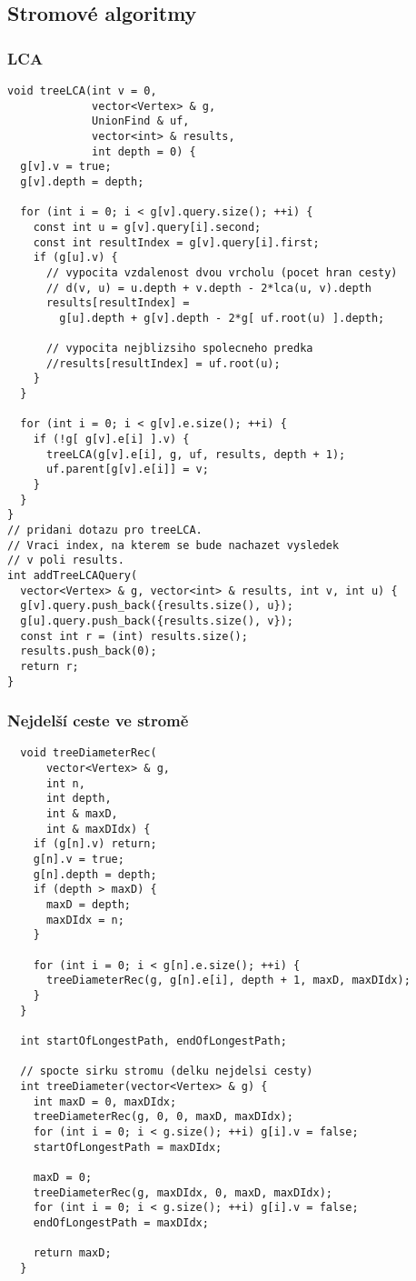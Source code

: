 \documentclass{article}
\begin{document}
\subsection{Stromové algoritmy}
\subsubsection{LCA}
\begin{lstlisting}
void treeLCA(int v = 0, 
             vector<Vertex> & g,
             UnionFind & uf,
             vector<int> & results,
             int depth = 0) {
  g[v].v = true;
  g[v].depth = depth;

  for (int i = 0; i < g[v].query.size(); ++i) {
    const int u = g[v].query[i].second;
    const int resultIndex = g[v].query[i].first;
    if (g[u].v) {
      // vypocita vzdalenost dvou vrcholu (pocet hran cesty)
      // d(v, u) = u.depth + v.depth - 2*lca(u, v).depth
      results[resultIndex] = 
        g[u].depth + g[v].depth - 2*g[ uf.root(u) ].depth;

      // vypocita nejblizsiho spolecneho predka
      //results[resultIndex] = uf.root(u);
    }
  }

  for (int i = 0; i < g[v].e.size(); ++i) {
    if (!g[ g[v].e[i] ].v) {
      treeLCA(g[v].e[i], g, uf, results, depth + 1);
      uf.parent[g[v].e[i]] = v;
    }
  }
}
// pridani dotazu pro treeLCA. 
// Vraci index, na kterem se bude nachazet vysledek
// v poli results.
int addTreeLCAQuery(
  vector<Vertex> & g, vector<int> & results, int v, int u) {
  g[v].query.push_back({results.size(), u});
  g[u].query.push_back({results.size(), v});
  const int r = (int) results.size();
  results.push_back(0);
  return r;
}
\end{lstlisting}

\subsubsection{Nejdelší ceste ve stromě}
\begin{lstlisting}
  void treeDiameterRec(
      vector<Vertex> & g,
      int n,
      int depth,
      int & maxD,
      int & maxDIdx) {
    if (g[n].v) return;
    g[n].v = true;
    g[n].depth = depth;
    if (depth > maxD) {
      maxD = depth;
      maxDIdx = n;
    }

    for (int i = 0; i < g[n].e.size(); ++i) {
      treeDiameterRec(g, g[n].e[i], depth + 1, maxD, maxDIdx);
    }
  }

  int startOfLongestPath, endOfLongestPath;

  // spocte sirku stromu (delku nejdelsi cesty)
  int treeDiameter(vector<Vertex> & g) {
    int maxD = 0, maxDIdx;
    treeDiameterRec(g, 0, 0, maxD, maxDIdx);
    for (int i = 0; i < g.size(); ++i) g[i].v = false;
    startOfLongestPath = maxDIdx;

    maxD = 0;
    treeDiameterRec(g, maxDIdx, 0, maxD, maxDIdx);
    for (int i = 0; i < g.size(); ++i) g[i].v = false;
    endOfLongestPath = maxDIdx;

    return maxD;
  }
\end{lstlisting}
\end{document}
